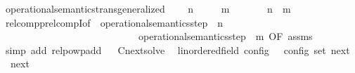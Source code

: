 \begin{isabellebody}
\isadelimdocument
%
\endisadelimdocument
%
\isatagdocument
%
\isamarkuptrue%
%
\endisatagdocument
{\isafolddocument}%
%
\isadelimdocument
%
\endisadelimdocument
{}\isamarkupfalse%
\ operational{\isacharunderscore}semantics{\isacharunderscore}trans{\isacharunderscore}generalized{\isacharcolon}\isanewline
\ \ \ {\isacartoucheopen}{\isasymC}\ {\isasymhookrightarrow}\isactrlbsup n\isactrlesup \ {\isasymC}\isanewline
\ \ \ {\isacartoucheopen}{\isasymC}\ {\isasymhookrightarrow}\isactrlbsup m\isactrlesup \ {\isasymC}\isanewline
\ \ \ \ \ {\isacartoucheopen}{\isasymC}\ {\isasymhookrightarrow}\isactrlbsup n\ {\isacharplus}\ m\isactrlesup \ {\isasymC}\isanewline
%
\isadelimproof
%
\endisadelimproof
%
\isatagproof
{}\isamarkupfalse%
\ relcompp{\isachardot}relcompI{\isacharbrackleft}of\ \ {\isacartoucheopen}operational{\isacharunderscore}semantics{\isacharunderscore}step\ {\isacharcircum}{\isacharcircum}\ n{\isacartoucheclose}\ {\isacharunderscore}\ {\isacharunderscore}\ \isanewline
\ \ \ \ \ \ \ \ \ \ \ \ \ \ \ \ \ \ \ \ \ \ \ \ \ \ \ \ {\isacartoucheopen}operational{\isacharunderscore}semantics{\isacharunderscore}step\ {\isacharcircum}{\isacharcircum}\ m{\isacartoucheclose}{\isacharcomma}\ OF\ assms{\isacharbrackright}\isanewline
{}\isamarkupfalse%
\ {\isacharparenleft}simp\ add{\isacharcolon}\ relpowp{\isacharunderscore}add{\isacharparenright}%
\endisatagproof
{\isafoldproof}%
%
\isadelimproof
\ \isanewline
%
\endisadelimproof
\isanewline
{}\isamarkupfalse%
\ Cnext{\isacharunderscore}solve\isanewline
\ \ {\isacharcolon}{\isacharcolon}{\isacartoucheopen}{\isacharparenleft}{\isacharprime}{\isasymtau}{\isacharcolon}{\isacharcolon}linordered{\isacharunderscore}field{\isacharparenright}\ config\ {\isasymRightarrow}\ {\isacharprime}{\isasymtau}\ config\ set{\isacartoucheclose}\ {\isacharparenleft}{\isachardoublequoteopen}{\isasymC}\isactrlsub n\isactrlsub e\isactrlsub x\isactrlsub t\ {\isacharunderscore}{\isachardoublequoteclose}{\isacharparenright}\isanewline
{}\isanewline
\ \ {\isacartoucheopen}{\isasymC}\isactrlsub n\isactrlsub e\isactrlsub x\isactrlsub t\ {\isasymS}\ {\isasymequiv}\ {\isacharbraceleft}\ {\isasymS}{\isacharprime}{\isachardot}\ {\isasymS}\ {\isasymhookrightarrow}\ {\isasymS}{\isacharprime}\ {\isacharbraceright}{\isacartoucheclose}\isanewline

\end{isabellebody}
